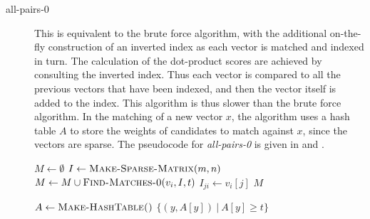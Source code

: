 \documentclass{comjnl}
\newcommand{\algo}[1]{\textsc{#1}} %
\newcommand{\var}[1]{\mbox{\textsl{#1}}} %
\begin{document}
\begin{description}

\item[all-pairs-0] This is equivalent to the brute force algorithm,
  with the additional on-the-fly construction of an inverted index as
  each vector is matched and indexed in turn. The calculation of the
  dot-product scores are achieved by consulting the inverted
  index. Thus each vector is compared to all the previous vectors that
  have been indexed, and then the vector itself is added to the
  index. This algorithm is thus slower than the brute force
  algorithm. In the matching of a new vector $x$, the algorithm uses a
  hash table $A$ to store the weights of candidates to match against
  $x$, since the vectors are sparse. 
  The pseudocode for \var{all-pairs-0} 
  is given in  and
  .


  \begin{algorithm}[top]
    \caption{$\algo{All-Pairs-0}(V,t)$}
    \label{alg:all-pairs-0}
    \begin{algorithmic}
      \STATE $M \gets \emptyset$ 
      \STATE $I \gets \algo{Make-Sparse-Matrix}(m, n)$ 
        \STATE $M \gets M \cup \algo{Find-Matches-0}(v_i, I, t)$ 
               \STATE $I_{ji} \gets v_i[j]$
           \ENDFOR
       \ENDFOR
      \RETURN $M$
    \end{algorithmic}
  \end{algorithm}


  \begin{algorithm}[top]
    \caption{$\algo{Find-Matches-0}(x,I,t)$}
    \label{alg:find-matches-0}
    \begin{algorithmic}
      \STATE $A \gets \algo{Make-HashTable()}$  
      \ENDFOR
      \ENDFOR
      \RETURN $\{ (y, A[y]) \ | \ A[y] \geq t \}$
    \end{algorithmic}
  \end{algorithm}


\end{description}
\end{document}
